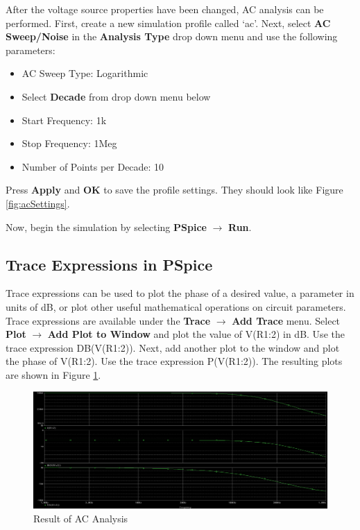 \documentclass[12pt]{../manual}
\begin{document}
After the voltage source properties have been changed, AC analysis can be performed. First, create a new simulation profile called `ac'. Next, select \textbf{AC Sweep/Noise} in the \textbf{Analysis Type} drop down menu and use the following parameters:
\begin{itemize}
\item AC Sweep Type: Logarithmic 
\item Select \textbf{Decade} from drop down menu below
\item Start Frequency: 1k
\item Stop Frequency: 1Meg
\item Number of Points per Decade: 10
\end{itemize}
Press \textbf{Apply} and \textbf{OK} to save the profile settings. They should look like Figure \ref{fig:acSettings}.

Now, begin the simulation by selecting \textbf{PSpice} $\to$ \textbf{Run}.

\subsection*{Trace Expressions in PSpice}
Trace expressions can be used to plot the phase of a desired value, a parameter in units of dB, or plot other useful mathematical operations on circuit parameters. Trace expressions are available under the \textbf{Trace} $\to$ \textbf{Add Trace} menu. Select \textbf{Plot} $\to$ \textbf{Add Plot to Window} and plot the value of V(R1:2) in dB. Use the trace expression DB(V(R1:2)). Next, add another plot to the window and plot the phase of V(R1:2). Use the trace expression P(V(R1:2)). The resulting plots are shown in Figure \ref{fig:acAnalRes}.

\begin{figure}[ht!]
\begin{center}
\includegraphics[width=\textwidth]{figures/ResultACAnalysisCrop.PNG}
\caption{Result of AC Analysis}
\label{fig:acAnalRes}
\end{center}
\end{figure}
%
\newpage
\end{document}
